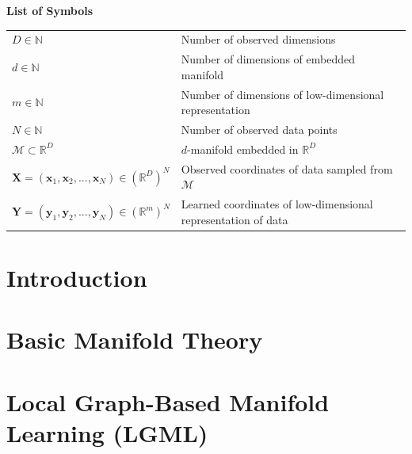 \documentclass[12pt]{article}
\newcommand{\mani}{\mathcal{M}}
\newcommand{\N}{\mathbb{N}}
\newcommand{\R}{\mathbb{R}}
\newcommand{\RD}{\mathbb{R}^D}
\begin{document}
% 

\tableofcontents
\newpage

\Large
\noindent
\textbf{List of Symbols}
\vspace{0.5cm} \\
\noindent
\normalsize

\begin{tabularx}{\textwidth}{ 
  >{\raggedleft\arraybackslash}X 
  >{\raggedright\arraybackslash}X}
  $D \in \N$ & Number of observed dimensions \\
  $d \in \N$ & Number of dimensions of embedded manifold \\
  $m \in \N$ & Number of dimensions of low-dimensional representation \\
  $N \in \N$ & Number of observed data points \\
  $\mani \subset \RD$ & $d$-manifold embedded in $\RD$ \\
  $\bm{X} = (\bm{x}_1, \bm{x}_2, ..., \bm{x}_N) \in (\RD)^N$ & Observed 
  coordinates of data sampled from $\mani$ \\
  $\bm{Y} = (\bm{y}_1, \bm{y}_2, ..., \bm{y}_N) \in (\R^m)^N$ & Learned 
  coordinates of low-dimensional representation of data
\end{tabularx}

\newpage

\listoffigures
\newpage
\listoftables
\newpage


    
\section{Introduction}
\label{intro}


\section{Basic Manifold Theory}
\label{math}


\section{Local Graph-Based Manifold Learning (LGML)}
\label{lgml}

\end{document}
